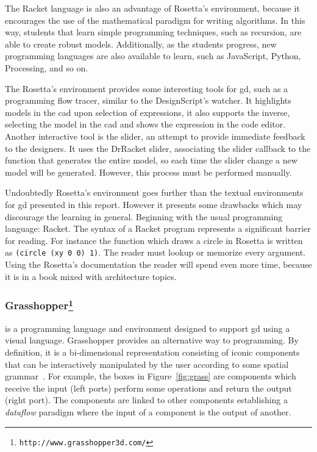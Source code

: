 The Racket language is also an advantage of Rosetta's environment, because it encourages the use of the mathematical paradigm for writing algorithms. In this way, students that learn simple programming techniques, such as recursion, are able to create robust models. Additionally, as the students progress, new programming languages are also available to learn, such as JavaScript, Python, Processing, and so on.

The Rosetta's environment provides some interesting tools for \ac{gd}, such as a programming flow tracer, similar to the DesignScript's watcher. It highlights models in the \ac{cad} upon selection of expressions, it also supports the inverse, selecting the model in the \ac{cad} and shows the expression in the code editor. Another interactive tool is the slider, an attempt to provide immediate feedback to the designers. It uses the DrRacket slider, associating the slider callback to the function that generates the entire model, so each time the slider change a new model will be generated. However, this process must be performed manually.

Undoubtedly Rosetta's environment goes further than the textual environments for \ac{gd} presented in this report. However it presents some drawbacks which may discourage the learning in general. Beginning with the usual programming language: Racket. The syntax of a Racket program represents a significant barrier for reading. For instance the function which draws a circle in Rosetta is written as \texttt{(circle (xy 0 0) 1)}. The reader must lookup or memorize every argument. Using the Rosetta's documentation the reader will spend even more time, because it is in a book mixed with architecture topics.
\subsubsection{Grasshopper\protect\footnote{\texttt{http://www.grasshopper3d.com/}}} is a programming language and environment designed to support \ac{gd} using a visual language. Grasshopper provides an alternative way to programming. By definition, it is a bi-dimensional representation consisting of iconic components that can be interactively manipulated by the user according to some spatial grammar~\cite{myers1990taxonomies}. For example, the boxes in Figure~\ref{fig:grass} are components which receive the input (left ports) perform some operations and return the output (right port). The components are linked to other components establishing a \textit{dataflow} paradigm where the input of a component is the output of another.

